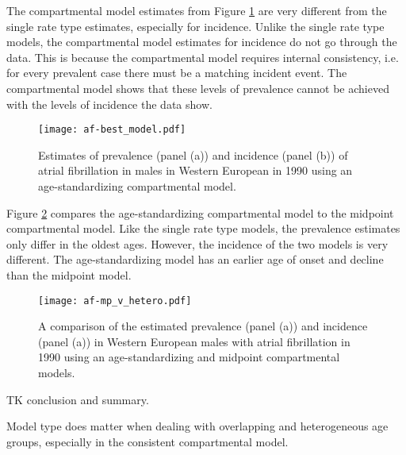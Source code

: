The compartmental model estimates from Figure \ref{fig:app-af age-stand}
are very different from the single rate type estimates, especially for incidence.
Unlike the single rate type models, the compartmental model estimates for
incidence do not go through the data.  This is because the compartmental model
requires internal consistency, i.e. for every prevalent case there must be
a matching incident event.  The compartmental model shows that these levels
of prevalence cannot be achieved with the levels of incidence the data show.

    \begin{figure}[h]
        \begin{center}
            \texttt{[image: af-best\_model.pdf]}
            \caption{Estimates of prevalence (panel (a)) and incidence (panel (b))
              of atrial fibrillation in males in Western European in 1990 using
              an age-standardizing compartmental model.}
            \label{fig:app-af age-stand}
        \end{center}
    \end{figure}

Figure \ref{fig:app-af compare} compares the age-standardizing compartmental
model to the midpoint compartmental model.  Like the single rate type models,
the prevalence estimates only differ in the oldest ages.  However, the
incidence of the two models is very different.  The age-standardizing model
has an earlier age of onset and decline than the midpoint model.

    \begin{figure}[h]
        \begin{center}
            \texttt{[image: af-mp\_v\_hetero.pdf]}
            \caption{A comparison of the estimated prevalence (panel (a)) and incidence (panel
              (a)) in Western European males with atrial fibrillation in 1990 using
              an age-standardizing and midpoint compartmental models.}
            \label{fig:app-af compare}
        \end{center}
    \end{figure}

TK conclusion and summary.

Model type does matter when dealing with overlapping and heterogeneous age
groups, especially in the consistent compartmental model.
